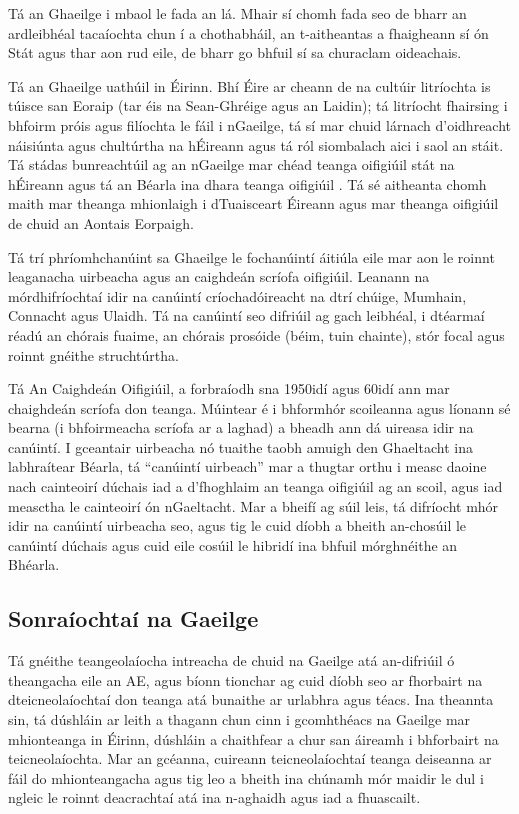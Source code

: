 \begin{multicols}{2}
Tá an Ghaeilge i mbaol le fada an lá. Mhair sí chomh fada seo de bharr an ardleibhéal tacaíochta chun í a chothabháil, an t-aitheantas a fhaigheann sí ón Stát agus thar aon rud eile, de bharr go bhfuil sí sa churaclam oideachais. 


Tá an Ghaeilge uathúil in Éirinn. Bhí Éire ar cheann de na cultúir litríochta is túisce san Eoraip (tar éis na Sean-Ghréige agus an Laidin); tá litríocht fhairsing i bhfoirm próis agus filíochta le fáil i nGaeilge, tá sí mar chuid lárnach d’oidhreacht náisiúnta agus chultúrtha na hÉireann agus tá ról siombalach aici i saol an stáit. Tá stádas bunreachtúil ag an nGaeilge mar chéad teanga oifigiúil stát na hÉireann agus tá an Béarla ina dhara teanga oifigiúil \cite{govtstatement06} \cite{20yearstrategy}. Tá sé aitheanta chomh maith mar theanga mhionlaigh i dTuaisceart Éireann agus mar theanga oifigiúil de chuid an Aontais Eorpaigh.

Tá trí phríomhchanúint sa Ghaeilge le fochanúintí áitiúla eile mar aon le roinnt leaganacha uirbeacha agus an caighdeán scríofa oifigiúil. Leanann na mórdhifríochtaí idir na canúintí críochadóireacht na dtrí chúige, Mumhain, Connacht agus Ulaidh. Tá na canúintí seo difriúil ag gach leibhéal, i dtéarmaí réadú an chórais fuaime, an chórais prosóide (béim, tuin chainte), stór focal agus roinnt gnéithe struchtúrtha. 

Tá An Caighdeán Oifigiúil, a forbraíodh sna 1950idí agus 60idí ann mar chaighdeán scríofa don teanga. Múintear é i bhformhór scoileanna agus líonann sé bearna (i bhfoirmeacha scríofa ar a laghad) a bheadh ann dá uireasa idir na canúintí. I gceantair uirbeacha nó tuaithe taobh amuigh den Ghaeltacht ina labhraítear Béarla, tá “canúintí uirbeach” mar a thugtar orthu i measc daoine nach cainteoirí dúchais iad a d’fhoghlaim an teanga oifigiúil ag an scoil, agus iad measctha le cainteoirí ón nGaeltacht. Mar a bheifí ag súil leis, tá difríocht mhór idir na canúintí uirbeacha seo, agus tig le cuid díobh a bheith an-chosúil le canúintí dúchais agus cuid eile cosúil le hibridí ina bhfuil mórghnéithe an Bhéarla. 


\subsection{Sonraíochtaí na Gaeilge}
\label{AboutIrish_ga}

Tá gnéithe teangeolaíocha intreacha de chuid na Gaeilge atá an-difriúil ó theangacha eile an AE, agus bíonn tionchar ag cuid díobh seo ar fhorbairt na dteicneolaíochtaí don teanga atá bunaithe ar urlabhra agus téacs. Ina theannta sin, tá dúshláin ar leith a thagann chun cinn i gcomhthéacs na Gaeilge mar mhionteanga in Éirinn, dúshláin a chaithfear a chur san áireamh i bhforbairt na teicneolaíochta. Mar an gcéanna, cuireann teicneolaíochtaí teanga deiseanna ar fáil do mhionteangacha agus tig leo a bheith ina chúnamh mór maidir le dul i ngleic le roinnt deacrachtaí atá ina n-aghaidh agus iad a fhuascailt.


\end{multicols}
